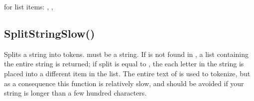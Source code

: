 \documentclass[letterpaper,10pt,english]{sphinxmanual}
\begin{document}
\sphinxAtStartPar
{}

\begin{sphinxVerbatim}[commandchars=\\\{\}]
\end{sphinxVerbatim}

\sphinxAtStartPar
{}

\begin{sphinxVerbatim}[commandchars=\\\{\}]
\PYG{p}{[}\PYG{p}{]}

\PYG{p}{[}\PYG{p}{]}
\PYG{p}{[}\PYG{p}{]}
\end{sphinxVerbatim}

\sphinxAtStartPar
{}

\sphinxAtStartPar
for list items:  , ,

\ignorespaces 

\subsection{SplitStringSlow()}
\label{\detokenize{reference/utility:splitstringslow}}\label{\detokenize{reference/utility:index-37}}
\sphinxAtStartPar
{}

\sphinxAtStartPar
Splits a string into tokens.  must be a string. If            is not found in , a list containing the entire                  string is returned; if split is equal to , the each letter                in the string is placed into a different item in the list.  The entire text of  is used to tokenize, but as a consequence this function is relatively slow, and should be avoided if your string is longer than a few hundred characters.
\end{document}
